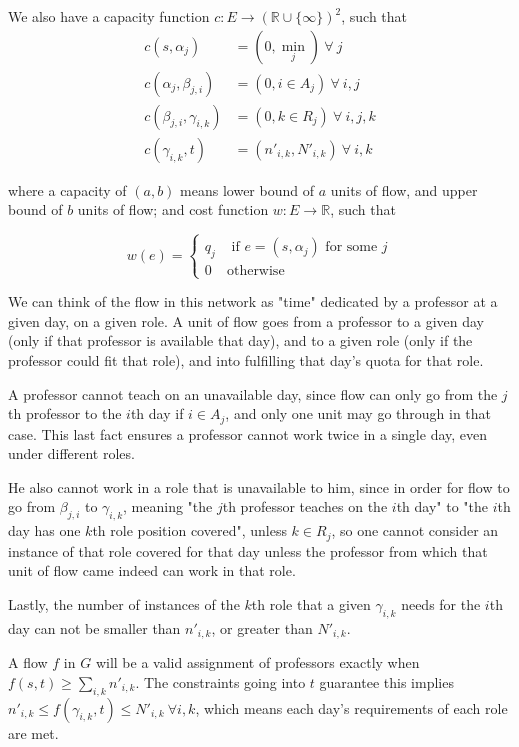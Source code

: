 We also have a capacity function $c:E \to \left(\mathbb{R} \cup \{\infty\}\right)^2$, such that
\begin{align*}
  c(s, \alpha_j) &= (0, \textstyle\min_j)\ \forall\ j\\
  c(\alpha_j, \beta_{j, i}) &= (0, i \in A_j)\ \forall\ i, j\\
  c(\beta_{j, i}, \gamma_{i, k}) &= (0, k \in R_j)\ \forall\ i, j, k\\
  c(\gamma_{i, k}, t) &= (n'_{i, k}, N'_{i, k})\ \forall\ i, k
\end{align*}

where a capacity of $(a, b)$ means lower bound of $a$ units of flow, and upper bound of $b$ units of flow; and cost function $w:E \to \mathbb{R}$, such that

$$
w(e) =
\begin{cases}
q_j &\text{ if } e = (s, \alpha_j) \text{ for some }j\\
0 & \text{otherwise}
\end{cases}
$$

We can think of the flow in this network as "time" dedicated by a professor at a given day, on a given role. A unit of flow goes from a professor to a given day (only if that professor is available that day), and to a given role (only if the professor could fit that role), and into fulfilling that day's quota for that role.

A professor cannot teach on an unavailable day, since flow can only go from the $j$th professor to the $i$th day if $i \in A_j$, and only one unit may go through in that case. This last fact ensures a professor cannot work twice in a single day, even under different roles.

He also cannot work in a role that is unavailable to him, since in order for flow to go from $\beta_{j, i}$ to $\gamma_{i, k}$, meaning "the $j$th professor teaches on the $i$th day" to "the $i$th day has one $k$th role position covered", unless $k \in R_j$, so one cannot consider an instance of that role covered for that day unless the professor from which that unit of flow came indeed can work in that role.

Lastly, the number of instances of the $k$th role that a given $\gamma_{i, k}$ needs for the $i$th day can not be smaller than $n'_{i, k}$, or greater than $N'_{i, k}$.

A flow $f$ in $G$ will be a valid assignment of professors exactly when $f(s, t) \ge \sum_{i, k} n'_{i, k}$. The constraints going into $t$ guarantee this implies $n'_{i, k} \le f(\gamma_{i, k}, t) \le N'_{i, k}\ \forall i, k$, which means each day's requirements of each role are met.

